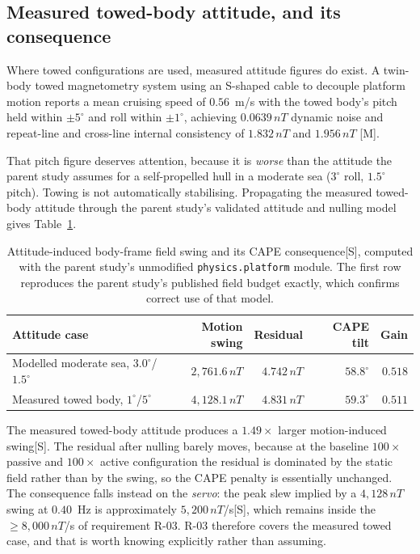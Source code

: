 \documentclass[11pt]{article}
\newcommand{\nT}{\,nT}\newcommand{\pT}{\,pT}\newcommand{\fT}{\,fT}
\newcommand{\meas}{\textcolor{blue!55!black}{\footnotesize[M]}}
\newcommand{\sig}{\textcolor{violet!70!black}{\footnotesize[S]}}
\begin{document}
\subsection{Measured towed-body attitude, and its consequence}
Where towed configurations are used, measured attitude figures do exist. A
twin-body towed magnetometry system using an S-shaped cable to decouple platform
motion reports a mean cruising speed of $0.56$~m/s with the towed body's pitch
held within $\pm5^\circ$ and roll within $\pm1^\circ$, achieving $0.0639\nT$
dynamic noise and repeat-line and cross-line internal consistency of $1.832\nT$
and $1.956\nT$ \cite{waveglider2025}\meas.

That pitch figure deserves attention, because it is \emph{worse} than the
attitude the parent study assumes for a self-propelled hull in a moderate sea
($3^\circ$ roll, $1.5^\circ$ pitch). Towing is not automatically stabilising.
Propagating the measured towed-body attitude through the parent study's
validated attitude and nulling model gives Table~\ref{tab:attitude}.

\begin{table}[htbp]\centering\small
\begin{tabular}{lrrrr}
\toprule
\textbf{Attitude case}&\textbf{Motion swing}&\textbf{Residual}&\textbf{CAPE tilt}&\textbf{Gain}\\
\midrule
Modelled moderate sea, $3.0^\circ$/$1.5^\circ$&$2{,}761.6\nT$&$4.742\nT$&$58.8^\circ$&$0.518$\\
Measured towed body, $1^\circ$/$5^\circ$ \cite{waveglider2025}&$4{,}128.1\nT$&$4.831\nT$&$59.3^\circ$&$0.511$\\
\bottomrule
\end{tabular}
\caption{Attitude-induced body-frame field swing and its CAPE consequence\sig,
computed with the parent study's unmodified \texttt{physics.platform} module.
The first row reproduces the parent study's published field budget exactly,
which confirms correct use of that model.}\label{tab:attitude}
\end{table}

The measured towed-body attitude produces a $1.49\times$ larger motion-induced
swing\sig. The residual after nulling barely moves, because at the baseline
$100\times$ passive and $100\times$ active configuration the residual is
dominated by the static field rather than by the swing, so the CAPE penalty is
essentially unchanged. The consequence falls instead on the \emph{servo}: the
peak slew implied by a $4{,}128\nT$ swing at $0.40$~Hz is approximately
$5{,}200\nT$/s\sig, which remains inside the $\geq8{,}000\nT$/s of requirement
R-03. R-03 therefore covers the measured towed case, and that is worth knowing
explicitly rather than assuming.
\end{document}

